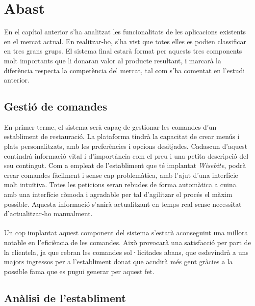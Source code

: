 
\section{Abast}

En el capítol anterior s'ha analitzat les funcionalitats de les aplicacions existents en el mercat actual. En realitzar-ho, s'ha vist que totes elles es podien classificar en tres grans grups. El sistema final estarà format per aquests tres components molt importants que li donaran valor al producte resultant, i marcarà la diferència respecta la competència del mercat, tal com s'ha comentat en l'estudi anterior.

\subsection{Gestió de comandes}

En primer terme, el sistema serà capaç de gestionar les comandes d'un establiment de restauració. La plataforma tindrà la capacitat de crear menús i plats personalitzats, amb les preferències i opcions desitjades. Cadascun d'aquest contindrà informació vital i d'importància com el preu i una petita descripció del seu contingut. Com a empleat de l'establiment que té implantat \textit{Wisebite}, podrà crear comandes fàcilment i sense cap problemàtica, amb l'ajut d'una interfície molt intuïtiva. Totes les peticions seran rebudes de forma automàtica a cuina amb una interfície còmoda i agradable per tal d'agilitzar el procés el màxim possible. Aquesta informació s'anirà actualitzant en temps real sense necessitat d'actualitzar-ho manualment.
\\\\
Un cop implantat aquest component del sistema s'estarà aconseguint una millora notable en l'eficiència de les comandes. Això provocarà una satisfacció per part de la clientela, ja que rebran les comandes sol·licitades abans, que esdevindrà a uns majors ingressos per a l'establiment donat que acudirà més gent gràcies a la possible fama que es pugui generar per aquest fet.

\subsection{Anàlisi de l'establiment}

